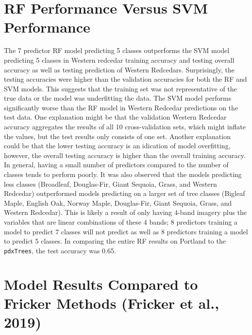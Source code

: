\documentclass[12pt,twoside]{reedthesis}
\begin{document}
\hypertarget{rf-performance-versus-svm-performance}{%
\section{RF Performance Versus SVM Performance}\label{rf-performance-versus-svm-performance}}

The 7 predictor RF model predicting 5 classes outperforms the SVM model predicting 5 classes in Western redcedar training accuracy and testing overall accuracy as well as testing prediction of Western Redcedars. Surprisingly, the testing accuracies were higher than the validation accuracies for both the RF and SVM models. This suggests that the training set was not representative of the true data or the model was underfitting the data. The SVM model performs significantly worse than the RF model in Western Redcedar predictions on the test data. One explanation might be that the validation Western Redcedar accuracy aggregates the results of all 10 cross-validation sets, which might inflate the values, but the test results only consists of one set. Another explanation could be that the lower testing accuracy is an idication of model overfitting, however, the overall testing accuracy is higher than the overall training accuracy. In general, having a small number of predictors compared to the number of classes tends to perform poorly. It was also observed that the models predicting less classes (Broadleaf, Douglas-Fir, Giant Sequoia, Grass, and Western Redcedar) outperformed models predicting on a larger set of tree classes (Bigleaf Maple, English Oak, Norway Maple, Douglas-Fir, Giant Sequoia, Grass, and Western Redcedar). This is likely a result of only having 4-band imagery plus the variables that are linear combinations of these 4 bands; 8 predictors training a model to predict 7 classes will not predict as well as 8 predictors training a model to predict 5 classes. In comparing the entire RF results on Portland to the \texttt{pdxTrees}, the test accuracy was 0.65.

\hypertarget{model-results-compared-to-fricker-methods-fricker_convolutional_2019}{%
\section{Model Results Compared to Fricker Methods (Fricker et al., 2019)}\label{model-results-compared-to-fricker-methods-fricker_convolutional_2019}}
\end{document}
